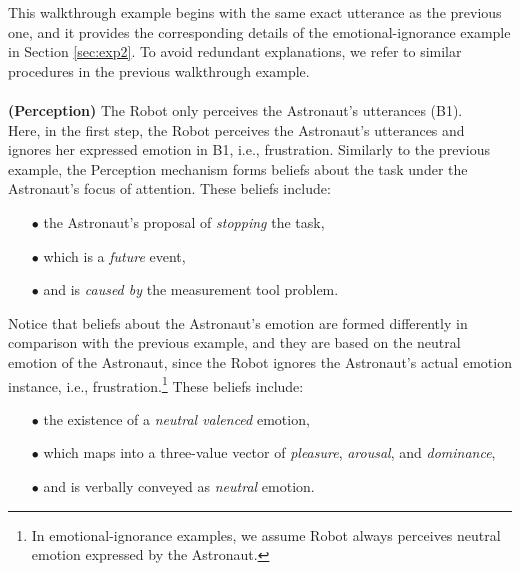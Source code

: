 This walkthrough example begins with the same exact utterance as the previous
one, and it provides the corresponding details of the emotional-ignorance
example in Section \ref{sec:exp2}. To avoid redundant explanations, we refer to
similar procedures in the previous walkthrough example.\\

\noindent{}\\

\noindent\textbf{(Perception)} The Robot only perceives the Astronaut's
utterances (B1).\\

Here, in the first step, the Robot perceives the Astronaut's utterances and
ignores her expressed emotion in B1, i.e., frustration. Similarly to the
previous example, the Perception mechanism forms beliefs about the task under
the Astronaut's focus of attention. These beliefs include:

\begin{itemize}
  \item[$\bullet$] the Astronaut's proposal of \textit{stopping} the task,
  \item[$\bullet$] which is a \textit{future} event,
  \item[$\bullet$] and is \textit{caused by} the measurement tool problem.
\end{itemize}

\noindent Notice that beliefs about the Astronaut's emotion are formed
differently in comparison with the previous example, and they are based on the
neutral emotion of the Astronaut, since the Robot ignores the Astronaut's actual
emotion instance, i.e., frustration.\footnote{In emotional-ignorance examples,
we assume Robot always perceives neutral emotion expressed by the Astronaut.} These
beliefs include:

\begin{itemize}
  \item[$\bullet$] the existence of a \textit{neutral valenced} emotion,
  \item[$\bullet$] which maps into a three-value vector of \textit{pleasure},
  \textit{arousal}, and \textit{dominance},
  \item[$\bullet$] and is verbally conveyed as \textit{neutral} emotion.\\
\end{itemize}

